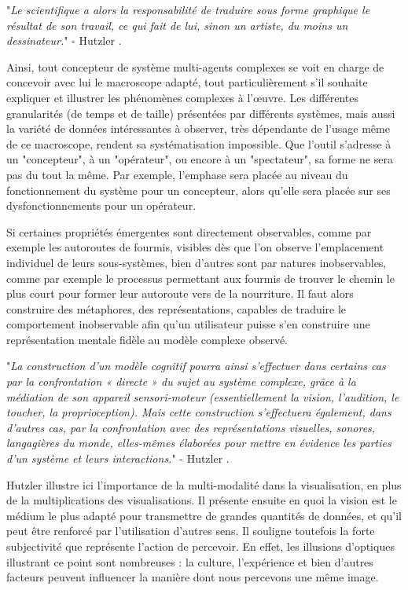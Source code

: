 		"\textit{Le scientifique a alors la responsabilité de traduire sous forme graphique le résultat de son travail, ce qui fait de lui, sinon un artiste, du moins un dessinateur.}" - Hutzler \cite{hutzler_du_2000}.

	Ainsi, tout concepteur de système multi-agents complexes se voit en charge de concevoir avec lui le macroscope adapté, tout particulièrement s'il souhaite expliquer et illustrer les phénomènes complexes à l'œuvre. Les différentes granularités (de temps et de taille) présentées par différents systèmes, mais aussi la variété de données intéressantes à observer, très dépendante de l'usage même de ce macroscope, rendent sa systématisation impossible. Que l'outil s'adresse à un "concepteur", à un "opérateur", ou encore à un "spectateur", sa forme ne sera pas du tout la même. Par exemple, l'emphase sera placée au niveau du fonctionnement du système pour un concepteur, alors qu'elle sera placée sur ses dysfonctionnements pour un opérateur.
		
	
	Si certaines propriétés émergentes sont directement observables, comme par exemple les autoroutes de fourmis, visibles dès que l'on observe l'emplacement individuel de leurs sous-systèmes, bien d'autres sont par natures inobservables, comme par exemple le processus permettant aux fourmis de trouver le chemin le plus court pour former leur autoroute vers de la nourriture. Il faut alors construire des métaphores, des représentations, capables de traduire le comportement inobservable afin qu'un utilisateur puisse s'en construire une représentation mentale fidèle au modèle complexe observé.

		"\textit{La construction d'un modèle cognitif pourra ainsi s'effectuer dans certains cas par la confrontation « directe » du sujet au système complexe, grâce à la médiation de son appareil sensori-moteur (essentiellement la vision, l'audition, le toucher, la proprioception). Mais cette construction s'effectuera également, dans d'autres cas, par la confrontation avec des représentations visuelles, sonores, langagières du monde, elles-mêmes élaborées pour mettre en évidence les parties d'un système et leurs interactions.}" - Hutzler \cite{hutzler_du_2000}.
		
		Hutzler illustre ici l'importance de la multi-modalité dans la visualisation, en plus de la multiplications des visualisations. Il présente ensuite en quoi la vision est le médium le plus adapté pour transmettre de grandes quantités de données, et qu'il peut être renforcé par l'utilisation d'autres sens. Il souligne toutefois la forte subjectivité que représente l'action de percevoir. En effet, les illusions d'optiques illustrant ce point sont nombreuses : la culture, l'expérience et bien d'autres facteurs peuvent influencer la manière dont nous percevons une même image.
		

